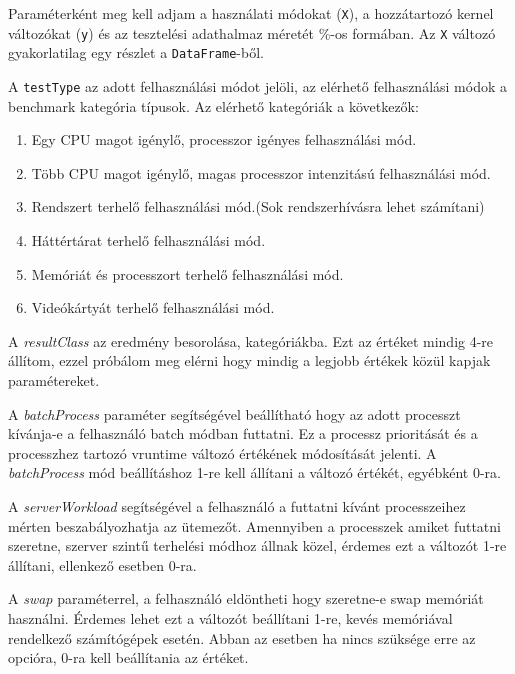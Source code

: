Paraméterként meg kell adjam a használati módokat (\texttt{X}), a hozzátartozó kernel változókat (\texttt{y}) és az tesztelési adathalmaz méretét \%-os formában.
Az \texttt{X} változó gyakorlatilag egy részlet a \texttt{DataFrame}-ből. %

A \texttt{testType} az adott felhasználási módot jelöli, az elérhető felhasználási módok a benchmark kategória típusok. Az elérhető kategóriák a következők: 
\begin{enumerate}
\item Egy CPU magot igénylő, processzor igényes felhasználási mód.
\item Több CPU magot igénylő, magas processzor intenzitású felhasználási mód.
\item Rendszert terhelő felhasználási mód.(Sok rendszerhívásra lehet számítani)
\item Háttértárat terhelő felhasználási mód.
\item Memóriát és processzort terhelő felhasználási mód.
\item Videókártyát terhelő felhasználási mód.
\end{enumerate}

A \textit{resultClass} az eredmény besorolása, kategóriákba. Ezt az értéket mindig 4-re állítom, ezzel próbálom meg elérni hogy mindig a legjobb értékek közül kapjak paramétereket.

A \textit{batchProcess} paraméter segítségével beállítható hogy az adott processzt kívánja-e a felhasználó batch módban futtatni. Ez a processz prioritását és a processzhez tartozó vruntime változó értékének módosítását jelenti. A \textit{batchProcess} mód beállításhoz 1-re kell állítani a változó értékét, egyébként 0-ra.

A \textit{serverWorkload} segítségével a felhasználó a futtatni kívánt processzeihez mérten beszabályozhatja az ütemezőt. Amennyiben a processzek amiket futtatni szeretne, szerver szintű terhelési módhoz állnak közel, érdemes ezt a változót 1-re állítani, ellenkező esetben 0-ra.

A \textit{swap} paraméterrel, a felhasználó eldöntheti hogy szeretne-e swap memóriát használni. Érdemes lehet ezt a változót beállítani 1-re, kevés memóriával rendelkező számítógépek esetén. Abban az esetben ha nincs szüksége erre az opcióra, 0-ra kell beállítania az értéket.

